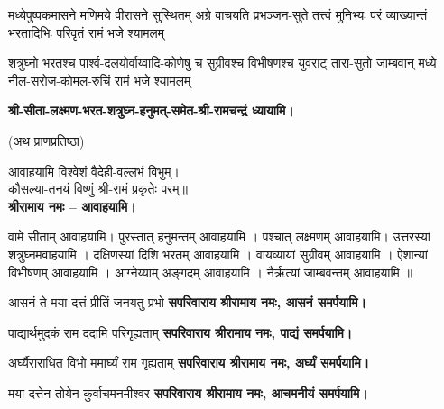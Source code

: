 






 
\begin{center}

\renewcommand{\devAya}{सपरिवाराय श्रीरामाय नमः,}

{मध्येपुष्पकमासने मणिमये वीरासने सुस्थितम्}
{अग्रे वाचयति प्रभञ्जन-सुते तत्त्वं मुनिभ्यः परं}
{व्याख्यान्तं भरतादिभिः परिवृतं रामं भजे श्यामलम्}

{शत्रुघ्नो भरतश्च पार्श्व-दलयोर्वाय्वादि-कोणेषु च}
{सुग्रीवश्च विभीषणश्च युवराट् तारा-सुतो जाम्बवान्}
{मध्ये नील-सरोज-कोमल-रुचिं रामं भजे श्यामलम्}

\textbf{श्री-सीता-लक्ष्मण-भरत-शत्रुघ्न-हनुमत्-समेत-श्री-रामचन्द्रं ध्यायामि।}

(अथ प्राणप्रतिष्ठा)


आवाहयामि विश्वेशं वैदेही-वल्लभं विभुम्।\\
कौसल्या-तनयं विष्णुं श्री-रामं प्रकृतेः परम्॥\\
\textbf{श्रीरामाय नमः – आवाहयामि।}

वामे सीताम् आवाहयामि।
पुरस्तात् हनुमन्तम् आवाहयामि ।
पश्चात् लक्ष्मणम् आवाहयामि।
उत्तरस्यां शत्रुघ्नमवाहयामि ।
दक्षिणस्यां दिशि भरतम् आवाहयामि ।
वायव्यायां सुग्रीवम् आवाहयामि ।
ऐशान्यां विभीषणम् आवाहयामि ।
आग्नेय्याम् अङ्गदम् आवाहयामि ।
नैर्ऋत्यां जाम्बवन्तम् आवाहयामि ॥

{आसनं ते मया दत्तं प्रीतिं जनयतु प्रभो}
\textbf{\devAya{} आसनं समर्पयामि।\\}

{पाद्यार्थमुदकं राम ददामि परिगृह्यताम्}
\textbf{\devAya{} पाद्यं समर्पयामि।\\}

{अर्घ्यैराराधित विभो ममार्घ्यं राम गृह्यताम्}
\textbf{\devAya{} अर्घ्यं समर्पयामि।\\}

{मया दत्तेन तोयेन कुर्वाचमनमीश्वर}
\textbf{\devAya{} आचमनीयं समर्पयामि।\\}


\end{center}
